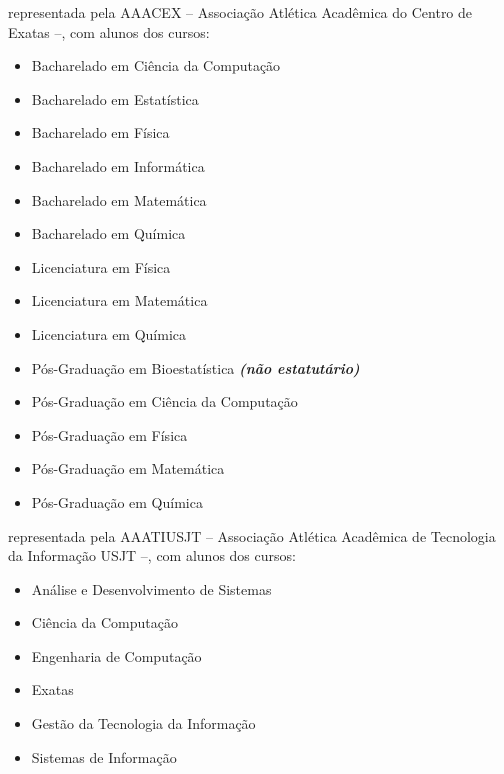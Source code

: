 \begin{article}
\begin{description}[noitemsep]
		\item[UEM] representada pela AAACEX -- Associação Atlética Acadêmica do Centro de Exatas --, com alunos dos cursos:
		\begin{itemize}[noitemsep]
			\item Bacharelado em Ciência da Computação
			\item Bacharelado em Estatística
			\item Bacharelado em Física 
			\item Bacharelado em Informática
			\item Bacharelado em Matemática
			\item Bacharelado em Química 
			\item Licenciatura em Física 
			\item Licenciatura em Matemática
			\item Licenciatura em Química 
			\item Pós-Graduação em Bioestatística \textbf{\textit{(não estatutário)}}
			\item Pós-Graduação em Ciência da Computação
			\item Pós-Graduação em Física 
			\item Pós-Graduação em Matemática
			\item Pós-Graduação em Química 
		\end{itemize}

		\item[Universidade São Judas Tadeu] representada pela AAATIUSJT -- Associação Atlética Acadêmica de Tecnologia da Informação USJT --, com alunos dos cursos:
		\begin{itemize}[noitemsep]
			\item Análise e Desenvolvimento de Sistemas
			\item Ciência da Computação
			\item Engenharia de Computação
			\item Exatas
			\item Gestão da Tecnologia da Informação
			\item Sistemas de Informação
		\end{itemize}


\end{description}
\end{article}
